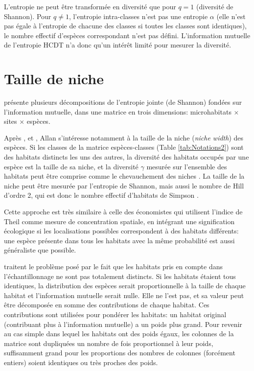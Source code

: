\documentclass[
  11pt,
  french,
  a4paper,
  extrafontsizes,onecolumn,openright
  ]{memoir}
\begin{document}
L'entropie ne peut être transformée en diversité que pour \(q=1\) (diversité de Shannon).
Pour \(q \ne 1\), l'entropie intra-classes n'est pas une entropie \(\alpha\) (elle n'est pas égale à l'entropie de chacune des classes si toutes les classes sont identiques), le nombre effectif d'espèces correspondant n'est pas défini.
L'information mutuelle de l'entropie HCDT n'a donc qu'un intérêt limité pour mesurer la diversité.

\section{Taille de niche}\label{taille-de-niche}

\textcite{Allan1975} présente plusieurs décompositions de l'entropie jointe (de Shannon) fondées sur l'information mutuelle, dans une matrice en trois dimensions: microhabitats \(\times\) sites \(\times\) espèces.

Après \textcite{Levins1968}, \textcite{Colwell1971} et \textcite{Pielou1972}, Allan s'intéresse notamment à la taille de la niche (\emph{niche width}) des espèces.
Si les classes de la matrice espèces-classes (Table \ref{tab:Notations2}) sont des habitats distincts les uns des autres, la diversité des habitats occupés par une espèce est la taille de sa niche, et la diversité \(\gamma\) mesurée sur l'ensemble des habitats peut être comprise comme le chevauchement des niches \autocite{Pielou1972}.
La taille de la niche peut être mesurée par l'entropie de Shannon, mais aussi le nombre de Hill d'ordre 2, qui est donc le nombre effectif d'habitats de Simpson \autocite{Levins1968}.

Cette approche est très similaire à celle des économistes qui utilisent l'indice de Theil comme mesure de concentration spatiale, en intégrant une signification écologique si les localisations possibles correspondent à des habitats différents: une espèce présente dans tous les habitats avec la même probabilité est aussi généraliste que possible.

\textcite{Colwell1971} traitent le problème posé par le fait que les habitats pris en compte dans l'échantillonnage ne sont pas totalement distincts.
Si les habitats étaient tous identiques, la distribution des espèces serait proportionnelle à la taille de chaque habitat et l'information mutuelle serait nulle.
Elle ne l'est pas, et sa valeur peut être décomposée en somme des contributions de chaque habitat.
Ces contributions sont utilisées pour pondérer les habitats: un habitat original (contribuant plus à l'information mutuelle) a un poids plus grand.
Pour revenir au cas simple dans lequel les habitats ont des poids égaux, les colonnes de la matrice sont dupliquées un nombre de fois proportionnel à leur poids, suffisamment grand pour les proportions des nombres de colonnes (forcément entiers) soient identiques ou très proches des poids.
\end{document}
